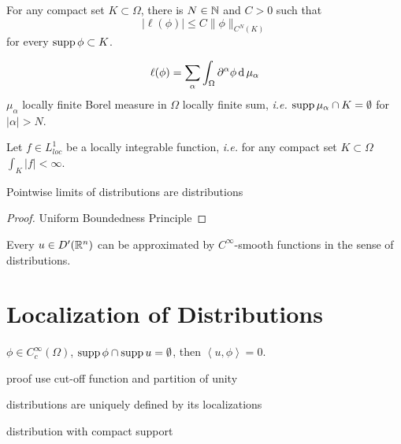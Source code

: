\begin{definition}
    For any compact set $K\subset \Omega$, there is $N\in\mathbb{N}$ and $C>0$ such that 
    \[|\ell(\phi)|\leq C\|\phi\|_{C^N(K)}\]
    for every $\operatorname{supp}\phi\subset K$.
\end{definition}

\begin{definition}
    \begin{equation}
        \ell(\phi)=\sum_{\alpha}\int_{\Omega}\partial^\alpha\phi\operatorname{\mathrm{d}}{\mu_\alpha}
    \end{equation}
    $\mu_\alpha$ locally finite Borel measure in $\Omega$
    locally finite sum, \emph{i.e.} $\operatorname{supp}\mu_\alpha\cap K=\emptyset$ for $|\alpha|>N$.
\end{definition}

\begin{example}
    Let $f\in L^1_{loc}$ be a locally integrable function, \emph{i.e.} for any compact set $K\subset\Omega$ $\int_K |f|<\infty$.
\end{example}

\begin{definition}
    
\end{definition}

\begin{definition}[Mollifiers]
    
\end{definition}

Pointwise limits of distributions are distributions
\begin{theorem}
    
\end{theorem}
\begin{proof}
    Uniform Boundedness Principle
\end{proof}

\begin{theorem}
    Every $u\in D'(\mathbb{R}^n)$ can be approximated by $C^\infty$-smooth functions in the sense of distributions.
\end{theorem}

\section{Localization of Distributions}

\begin{theorem}
    $\phi\in C_c^\infty(\Omega)$, $\operatorname{supp} \phi\cap\operatorname{supp} u=\emptyset$, then $\left\langle u,\phi\right\rangle=0$.
\end{theorem}

proof use cut-off function and partition of unity

distributions are uniquely defined by its localizations

distribution with compact support 